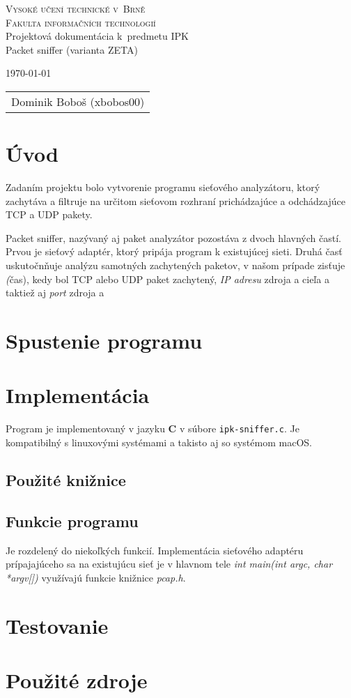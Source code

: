 \documentclass[11pt, a4paper]{article}
\begin{document}
	\begin{titlepage}
		\begin{center}
			\Huge
			\textsc{Vysoké učení technické v~Brně} \\
			\huge
			\textsc{Fakulta informačních technologií} \\
			\LARGE
			Projektová dokumentácia k~predmetu IPK \\
			\Huge
			Packet sniffer (varianta ZETA)
		\end{center}

		{\Large
			\today
			\hfill
			\begin{tabular}{r}
			Dominik Boboš (xbobos00)
			\end{tabular}
		}
	\end{titlepage}
	
	\tableofcontents
	\newpage
	
	\section{Úvod}
	Zadaním projektu bolo vytvorenie programu sieťového analyzátoru, ktorý zachytáva a filtruje na určitom sieťovom rozhraní prichádzajúce a odchádzajúce TCP a UDP pakety.
	
	Packet sniffer, nazývaný aj paket analyzátor pozostáva z dvoch hlavných častí. Prvou je sieťový adaptér, ktorý pripája program k existujúcej sieti. Druhá časť uskutočnňuje analýzu samotných zachytených paketov, v našom prípade zisťuje \emph(čas), kedy bol TCP alebo UDP paket zachytený, \emph{IP adresu} zdroja a cieľa a taktiež aj \emph{port} zdroja a 
	\section{Spustenie programu}
	\section{Implementácia}
	Program je implementovaný v jazyku \textbf{C} v súbore \texttt{ipk-sniffer.c}.  Je kompatibilný s linuxovými systémami a takisto aj so systémom macOS.
	\subsection{Použité knižnice}
	\subsection{Funkcie programu}
	Je rozdelený do niekoľkých funkcií. Implementácia sieťového adaptéru prípajajúceho sa na existujúcu sieť je v hlavnom tele \emph{int main(int argc, char *argv[])} využívajú funkcie knižnice \emph{pcap.h}.
	\section{Testovanie}
	\section{Použité zdroje}
	
	
\end{document}
